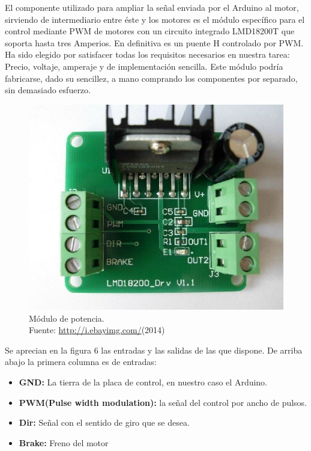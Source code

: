 El componente utilizado para ampliar la señal enviada por el Arduino al motor, sirviendo de intermediario entre éste y los motores es el módulo específico para el control mediante PWM de motores con un circuito integrado LMD18200T que soporta hasta tres Amperios. En definitiva es un puente H controlado por PWM.\\

Ha sido elegido por satisfacer todas los requisitos necesarios en nuestra tarea: Precio, voltaje, amperaje y de implementación sencilla. Este módulo podría fabricarse, dado su sencillez, a mano comprando los componentes por separado, sin demasiado esfuerzo.\\
\begin{figure}[H]
		\centering
		\includegraphics[scale = 0.3]{part/Proyecto_ejecutivo/memoria_constructiva/motor/img/modulopot}
		\caption[Módulo de potencia.]{Módulo de potencia.\\Fuente: \url{http://i.ebayimg.com/}(2014)}\label{fig:figure}
\end{figure}
	
Se aprecian en la figura 6 las entradas y las salidas de las que dispone. De arriba abajo la primera columna es de entradas:

\begin{itemize}
	\item \textbf{GND:} La tierra de la placa de control, en nuestro caso el Arduino.
	\item \textbf{PWM(Pulse width modulation):} la señal del control por ancho de pulsos.
	\item \textbf{Dir:} Señal con el sentido de giro que se desea.
	\item \textbf{Brake:} Freno del motor
\end{itemize}

